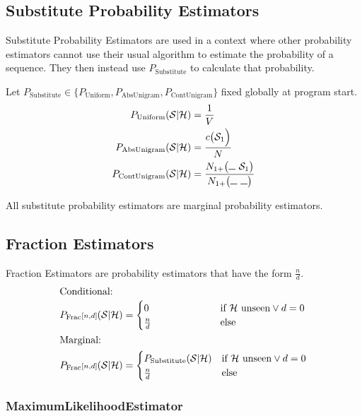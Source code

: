 \documentclass[11pt,a4paper]{article}
\newcommand{\Seq}{\mathcal{S}}
\newcommand{\Hist}{\mathcal{H}}
\newcommand{\Skp}{\rule{7pt}{.5pt}}
\begin{document}
  \subsection{Substitute Probability Estimators}

  Substitute Probability Estimators are used in a context where other
  probability estimators cannot use their usual algorithm to estimate the
  probability of a sequence. They then instead use $P_\mathrm{Substitute}$ to
  calculate that probability.

  Let $P_\mathrm{Substitute} \in \big\{ P_\mathrm{Uniform} , P_\mathrm{AbsUnigram} , P_\mathrm{ContUnigram}\big\}$
  fixed globally at program start.
  \begin{align}
    P_\mathrm{Uniform}(\Seq | \Hist) &= \frac{1}{V} \\
    P_\mathrm{AbsUnigram}(\Seq | \Hist) &= \frac{c\big(\Seq_1\Big)}{N} \\
    P_\mathrm{ContUnigram}(\Seq | \Hist) &= \frac{N_{1+}\big(\Skp ~ \Seq_1\big)}{N_{1+}\big(\Skp ~ \Skp\big)}
  \end{align}

  All substitute probability estimators are marginal probability estimators.

  \subsection{Fraction Estimators}

  Fraction Estimators are probability estimators that have the form $\frac{n}{d}$.
  \begin{alignat}{2}
    \intertext{Conditional:}
    P_\mathrm{Frac}{\scriptstyle[n , d]}(\Seq | \Hist) &= \begin{cases}
      0\hphantom{_\mathrm{Substitute}(\Seq | \Hist)} & \text{if} ~ \Hist ~ \mathrm{unseen} \lor d = 0 \\
      \frac{n}{d} & \text{else}
    \end{cases} \\
    \intertext{Marginal:}
    P_\mathrm{Frac}{\scriptstyle[n , d]}(\Seq | \Hist) &= \begin{cases}
      P_\mathrm{Substitute}(\Seq | \Hist) & \text{if} ~ \Hist ~ \mathrm{unseen} \lor d = 0 \\
      \frac{n}{d} & \text{else}
    \end{cases}
  \end{alignat}

  \subsubsection{MaximumLikelihoodEstimator}
\end{document}
